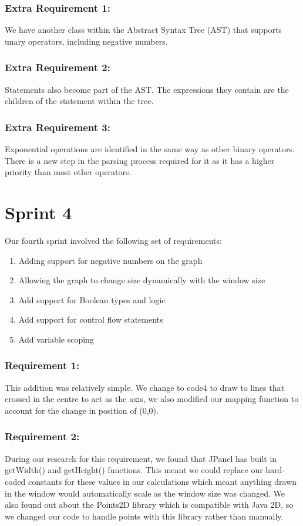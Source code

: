 \documentclass[a4paper, oneside, 11pt]{report}
\begin{document}
\subsubsection {Extra Requirement 1:}

We have another class within the Abstract Syntax Tree (AST) that supports unary operators, including negative numbers.

\subsubsection {Extra Requirement 2:}

Statements also become part of the AST. The expressions they contain are the children of the statement within the tree.

\subsubsection {Extra Requirement 3:}

Exponential operations are identified in the same way as other binary operators. There is a new step in the parsing process required for it as it has a higher priority than most other operators.


\section{Sprint 4}
Our fourth sprint involved the following set of requirements:
\begin{enumerate}
\item Adding support for negative numbers on the graph
\item Allowing the graph to change size dynamically with the window size
\item Add support for Boolean types and logic
\item Add support for control flow statements
\item Add variable scoping
\end{enumerate}

\subsubsection{Requirement 1:}
This addition was relatively simple. We change to code4 to draw to lines that crossed in the centre to act as the axis, we also modified our mapping function to account for  the change in position of (0,0).
\subsubsection{Requirement 2:}
During our research for this requirement, we found that JPanel has built in getWidth() and getHeight() functions. This meant we could replace our hard-coded constants for these values in our calculations which meant anything drawn in the window would automatically scale as the window size was changed.
We also found out about the Points2D library which is compatible with Java 2D, so we changed our code to handle points with this library rather than manually.
\end{document}
